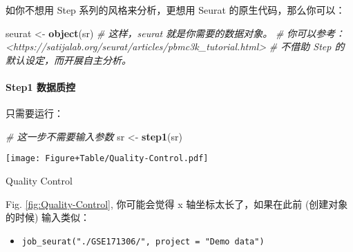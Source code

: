 \documentclass[
]{article}
\newenvironment{Shaded}{\begin{snugshade}}{\end{snugshade}}
\newcommand{\CommentTok}[1]{\textcolor[rgb]{0.56,0.35,0.01}{\textit{#1}}}
\newcommand{\KeywordTok}[1]{\textcolor[rgb]{0.13,0.29,0.53}{\textbf{#1}}}
\newcommand{\NormalTok}[1]{#1}
\newcommand{\OperatorTok}[1]{\textcolor[rgb]{0.81,0.36,0.00}{\textbf{#1}}}
\newcommand{\StringTok}[1]{\textcolor[rgb]{0.31,0.60,0.02}{#1}}
\providecommand{\tightlist}{%
  \setlength{\itemsep}{0pt}\setlength{\parskip}{0pt}}
\begin{document}
如你不想用 Step 系列的风格来分析，更想用 Seurat 的原生代码，那么你可以：

\begin{Shaded}
\begin{Highlighting}[]
\NormalTok{seurat \textless{}{-}}\StringTok{ }\KeywordTok{object}\NormalTok{(sr)}
\CommentTok{\# 这样，\textasciigrave{}seurat\textasciigrave{} 就是你需要的数据对象。}
\CommentTok{\# 你可以参考：\textless{}https://satijalab.org/seurat/articles/pbmc3k\_tutorial.html\textgreater{}}
\CommentTok{\# 不借助 Step 的默认设定，而开展自主分析。}
\end{Highlighting}
\end{Shaded}

\hypertarget{step1-ux6570ux636eux8d28ux63a7}{%
\paragraph{Step1 数据质控}\label{step1-ux6570ux636eux8d28ux63a7}}

只需要运行：

\begin{Shaded}
\begin{Highlighting}[]
\CommentTok{\# 这一步不需要输入参数}
\NormalTok{sr \textless{}{-}}\StringTok{ }\KeywordTok{step1}\NormalTok{(sr)}
\end{Highlighting}
\end{Shaded}

\begin{Shaded}
\end{Shaded}

\def\@captype{figure}
\begin{center}
\texttt{[image: Figure+Table/Quality-Control.pdf]}
\caption{Quality Control}\label{fig:Quality-Control}
\end{center}

Fig. \ref{fig:Quality-Control}, 你可能会觉得 x 轴坐标太长了，如果在此前
(创建对象的时候) 输入类似：

\begin{itemize}
\tightlist
\item
  \texttt{job\_seurat("./GSE171306/",\ project\ =\ "Demo\ data")}
\end{itemize}
\end{document}
